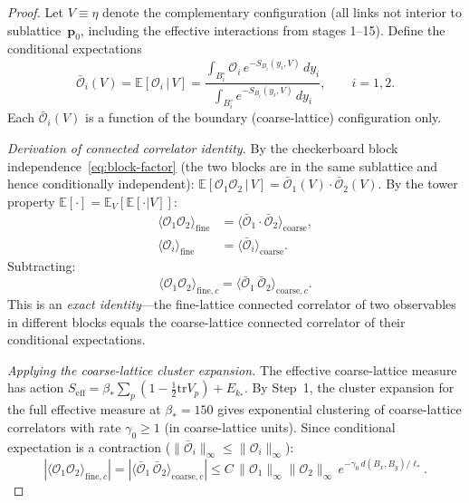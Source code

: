 \documentclass[11pt]{article}
\theoremstyle{definition}
\newcommand{\tr}{\mathrm{tr}}
\begin{document}
\begin{proof}
Let $V\equiv\eta$ denote the complementary configuration
(all links not interior to sublattice~$\mathbf{p}_0$,
including the effective interactions from stages 1--15).
Define the conditional expectations
\begin{equation}
\bar{\mathcal{O}}_i(V)
=\mathbb{E}[\mathcal{O}_i\,|\,V]
=\frac{\int_{B_i^\circ}\mathcal{O}_i\,
e^{-S_{B_i}(y_i,V)}\,dy_i}
{\int_{B_i^\circ}e^{-S_{B_i}(y_i,V)}\,dy_i},
\qquad i=1,2.
\end{equation}
Each $\bar{\mathcal{O}}_i(V)$ is a function of the boundary
(coarse-lattice) configuration only.

\emph{Derivation of connected correlator identity.}
By the checkerboard block independence~\eqref{eq:block-factor}
(the two blocks are in the same sublattice and hence
conditionally independent):
$\mathbb{E}[\mathcal{O}_1\mathcal{O}_2\,|\,V]
=\bar{\mathcal{O}}_1(V)\cdot\bar{\mathcal{O}}_2(V)$.
By the tower property
$\mathbb{E}[\cdot]=\mathbb{E}_V[\mathbb{E}[\cdot|V]]$:
\begin{align}
\langle\mathcal{O}_1\mathcal{O}_2\rangle_{\mathrm{fine}}
&=\langle\bar{\mathcal{O}}_1\cdot\bar{\mathcal{O}}_2
\rangle_{\mathrm{coarse}},\label{eq:tower-prod}\\
\langle\mathcal{O}_i\rangle_{\mathrm{fine}}
&=\langle\bar{\mathcal{O}}_i\rangle_{\mathrm{coarse}}.
\label{eq:tower-single}
\end{align}
Subtracting:
\begin{equation}\label{eq:fine-to-coarse}
\langle\mathcal{O}_1\mathcal{O}_2\rangle_{\mathrm{fine},c}
=\langle\bar{\mathcal{O}}_1\,\bar{\mathcal{O}}_2
\rangle_{\mathrm{coarse},c}.
\end{equation}
This is an \emph{exact identity}---the fine-lattice connected
correlator of two observables in different blocks equals the
coarse-lattice connected correlator of their conditional
expectations.

\emph{Applying the coarse-lattice cluster expansion.}
The effective coarse-lattice measure has action
$S_{\mathrm{eff}}=\beta_*\sum_p(1-\frac{1}{2}\tr V_p)+E_{k_*}$.
By Step~1, the cluster expansion for the full effective
measure at $\beta_*=150$ gives
exponential clustering of coarse-lattice correlators with
rate $\gamma_0\ge 1$ (in coarse-lattice units).
Since conditional expectation is a contraction
($\|\bar{\mathcal{O}}_i\|_\infty\le\|\mathcal{O}_i\|_\infty$):
\begin{equation}
|\langle\mathcal{O}_1\mathcal{O}_2\rangle_{\mathrm{fine},c}|
=|\langle\bar{\mathcal{O}}_1\,\bar{\mathcal{O}}_2
\rangle_{\mathrm{coarse},c}|
\le C\,\|\mathcal{O}_1\|_\infty\|\mathcal{O}_2\|_\infty\,
e^{-\gamma_0\,d(B_x,B_y)/\ell_*}.
\end{equation}


\end{proof}
\end{document}
